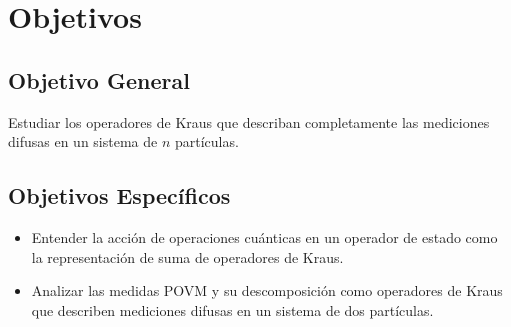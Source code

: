 
\chapter*{Objetivos} 

\section*{Objetivo General}

Estudiar los operadores de Kraus que describan completamente las mediciones difusas en un sistema de  $n$ partículas. 


\section*{Objetivos Específicos}
\begin{itemize}
	
\item Entender la acción de operaciones cuánticas en un operador de
estado como la representación de suma de operadores de Kraus. 

 \item Analizar las medidas POVM y su descomposición como operadores de
Kraus que describen mediciones difusas en un sistema de dos partículas.
	
	
\end{itemize}
